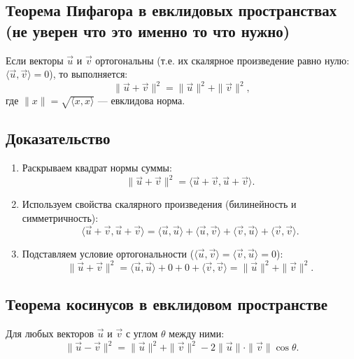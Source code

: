 \documentclass[12pt]{article}
\begin{document}
\subsection*{Теорема Пифагора в евклидовых пространствах (не уверен что это именно то что нужно)}
Если векторы $\vec{u}$ и $\vec{v}$ ортогональны (т.е. их скалярное произведение равно нулю: $\langle \vec{u}, \vec{v} \rangle = 0$), то выполняется:
$$
\|\vec{u} + \vec{v}\|^2 = \|\vec{u}\|^2 + \|\vec{v}\|^2,
$$
где $\|x\| = \sqrt{\langle x, x \rangle}$ — евклидова норма.

\subsection*{Доказательство}
\begin{enumerate}
    \item Раскрываем квадрат нормы суммы:
    $$
    \|\vec{u} + \vec{v}\|^2 = \langle \vec{u} + \vec{v}, \vec{u} + \vec{v} \rangle.
    $$
    \item Используем свойства скалярного произведения (билинейность и симметричность):
    $$
    \langle \vec{u} + \vec{v}, \vec{u} + \vec{v} \rangle = \langle \vec{u}, \vec{u} \rangle + \langle \vec{u}, \vec{v} \rangle + \langle \vec{v}, \vec{u} \rangle + \langle \vec{v}, \vec{v} \rangle.
    $$
    \item Подставляем условие ортогональности ($\langle \vec{u}, \vec{v} \rangle = \langle \vec{v}, \vec{u} \rangle = 0$):
    $$
    \|\vec{u} + \vec{v}\|^2 = \langle \vec{u}, \vec{u} \rangle + 0 + 0 + \langle \vec{v}, \vec{v} \rangle = \|\vec{u}\|^2 + \|\vec{v}\|^2.
    $$
\end{enumerate}

\subsection*{Теорема косинусов в евклидовом пространстве}
Для любых векторов $\vec{u}$ и $\vec{v}$ с углом $\theta$ между ними:
$$
\|\vec{u} - \vec{v}\|^2 = \|\vec{u}\|^2 + \|\vec{v}\|^2 - 2\|\vec{u}\| \cdot \|\vec{v}\| \cos \theta.
$$
\end{document}
